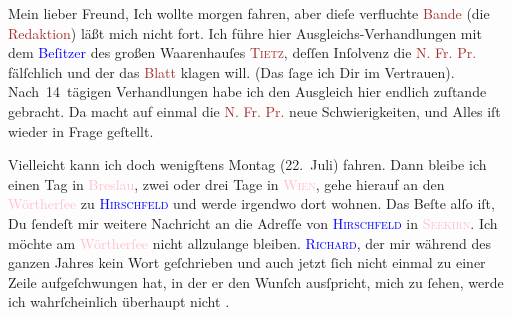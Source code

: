 \pstart\center{}Mein lieber Freund,\pend
\pstart
           Ich wollte morgen fahren, aber dieſe verfluchte \textcolor{brown}{Bande}{}\ledrightnote{{$\rightarrow$}\textcolor{brown}{Neue Freie Presse}} (die \textcolor{brown}{Redaktion}{}\ledrightnote{{$\rightarrow$}\textcolor{brown}{Neue Freie Presse}}) läßt mich nicht fort. Ich führe
               hier Ausgleichs-Verhandlungen mit dem \textcolor{blue}{Beſitzer}{}\ledrightnote{{$\rightarrow$}\textcolor{blue}{Oscar Tietz}} des großen Waarenhauſes \textsc{\textcolor{brown}{Tietz}{}\ledrightnote{\textcolor{brown}{Hermann Tietz und Co.}}}, deſſen Inſolvenz die \textcolor{brown}{N. Fr. Pr.}{}\ledrightnote{\textcolor{brown}{Neue Freie Presse}} fälſchlich
                  \label{K_L03073-1v}\label{K_L03073-1h} und der das \textcolor{brown}{Blatt}{}\ledrightnote{{$\rightarrow$}\textcolor{brown}{Neue Freie Presse}} klagen will. (Das ſage ich Dir im Vertrauen).
               Nach 14 tägigen Verhandlungen habe ich den Ausgleich hier endlich zuſtande gebracht.
               Da macht auf einmal die \textcolor{brown}{N. Fr. Pr.}{}\ledrightnote{\textcolor{brown}{Neue Freie Presse}} neue
               Schwierigkeiten, und Alles iſt {\pb}wieder in Frage geſtellt.\pend
           
\pstart
           Vielleicht kann ich doch wenigſtens Montag (22. Juli)
               fahren. Dann bleibe ich einen Tag in \textcolor{pink}{Breslau}{}\ledrightnote{\textcolor{pink}{Breslau}},
               zwei oder drei Tage in \textsc{\textcolor{pink}{Wien}{}\ledrightnote{\textcolor{pink}{Wien}}}, gehe hierauf an den \textcolor{pink}{Wörtherſee}{}\ledrightnote{\textcolor{pink}{Wörthersee}} zu \textsc{\textcolor{blue}{Hirschfeld}{}\ledrightnote{\textcolor{blue}{Robert Hirschfeld}}} und werde irgendwo dort wohnen. Das Beſte alſo iſt, Du ſendeſt mir weitere
               Nachricht an die Adreſſe von \textsc{\textcolor{blue}{Hirschfeld}{}\ledrightnote{\textcolor{blue}{Robert Hirschfeld}}} in \textsc{\textcolor{pink}{Seekirn}{}\ledrightnote{\textcolor{pink}{Sekirn}}}. Ich möchte am \textcolor{pink}{Wörtherſee}{}\ledrightnote{\textcolor{pink}{Wörthersee}} nicht allzulange
               bleiben. \textsc{\textcolor{blue}{Richard}{}\ledrightnote{\textcolor{blue}{Richard Beer-Hofmann}}}, der mir während des ganzen Jahres kein Wort geſchrieben und auch jetzt ſich
               nicht einmal zu einer Zeile {\pb}aufgeſchwungen hat, in der er den Wunſch ausſpricht, mich zu ſehen, werde ich
               wahrſcheinlich überhaupt nicht \label{K_L03073-43v}\label{K_L03073-43h}.\pend
           
